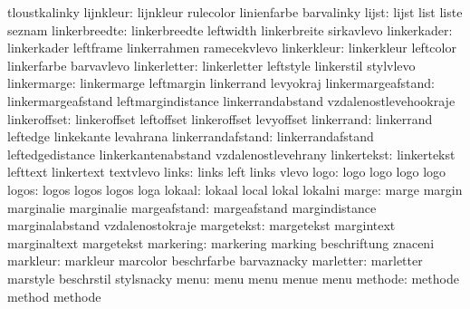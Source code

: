                        tloustkalinky
           lijnkleur:  lijnkleur            rulecolor            linienfarbe
                       barvalinky
               lijst:  lijst                list                 liste
                       seznam
       linkerbreedte:  linkerbreedte        leftwidth            linkerbreite
                       sirkavlevo
         linkerkader:  linkerkader          leftframe            linkerrahmen
                       ramecekvlevo
         linkerkleur:  linkerkleur          leftcolor            linkerfarbe
                       barvavlevo
        linkerletter:  linkerletter         leftstyle            linkerstil
                       stylvlevo
         linkermarge:  linkermarge          leftmargin           linkerrand
                       levyokraj
  linkermargeafstand:  linkermargeafstand   leftmargindistance   linkerrandabstand
                       vzdalenostlevehookraje
        linkeroffset:  linkeroffset         leftoffset           linkeroffset
                       levyoffset
          linkerrand:  linkerrand           leftedge             linkekante
                       levahrana
   linkerrandafstand:  linkerrandafstand    leftedgedistance     linkerkantenabstand
                       vzdalenostlevehrany
         linkertekst:  linkertekst          lefttext             linkertext
                       textvlevo
               links:  links                left                 links
                       vlevo
                logo:  logo                 logo                 logo
                       logo
               logos:  logos                logos                logos
                       loga
              lokaal:  lokaal               local                lokal
                       lokalni
               marge:  marge                margin               marginalie
                       marginalie
        margeafstand:  margeafstand         margindistance       marginalabstand
                       vzdalenostokraje
          margetekst:  margetekst           margintext           marginaltext
                       margetekst %
           markering:  markering            marking              beschriftung
                       znaceni
            markleur:  markleur             marcolor             beschrfarbe
                       barvaznacky
           marletter:  marletter            marstyle             beschrstil
                       stylsnacky
                menu:  menu                 menu                 menue
                       menu
             methode:  methode              method               methode
